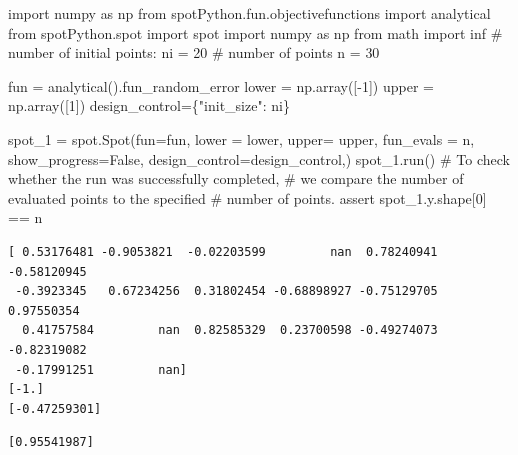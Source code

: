 \documentclass[
  letterpaper,
  DIV=11,
  numbers=noendperiod]{scrreprt}
\newenvironment{Shaded}{\begin{snugshade}}{\end{snugshade}}
\newcommand{\CommentTok}[1]{\textcolor[rgb]{0.37,0.37,0.37}{#1}}
\newcommand{\ControlFlowTok}[1]{\textcolor[rgb]{0.00,0.23,0.31}{#1}}
\newcommand{\DecValTok}[1]{\textcolor[rgb]{0.68,0.00,0.00}{#1}}
\newcommand{\ImportTok}[1]{\textcolor[rgb]{0.00,0.46,0.62}{#1}}
\newcommand{\NormalTok}[1]{\textcolor[rgb]{0.00,0.23,0.31}{#1}}
\newcommand{\OperatorTok}[1]{\textcolor[rgb]{0.37,0.37,0.37}{#1}}
\newcommand{\StringTok}[1]{\textcolor[rgb]{0.13,0.47,0.30}{#1}}
\newcommand{\VariableTok}[1]{\textcolor[rgb]{0.07,0.07,0.07}{#1}}
\begin{document}
\begin{Shaded}
\begin{Highlighting}[]
\ImportTok{import}\NormalTok{ numpy }\ImportTok{as}\NormalTok{ np}
\ImportTok{from}\NormalTok{ spotPython.fun.objectivefunctions }\ImportTok{import}\NormalTok{ analytical}
\ImportTok{from}\NormalTok{ spotPython.spot }\ImportTok{import}\NormalTok{ spot}
\ImportTok{import}\NormalTok{ numpy }\ImportTok{as}\NormalTok{ np}
\ImportTok{from}\NormalTok{ math }\ImportTok{import}\NormalTok{ inf}
\CommentTok{\# number of initial points:}
\NormalTok{ni }\OperatorTok{=} \DecValTok{20}
\CommentTok{\# number of points}
\NormalTok{n }\OperatorTok{=} \DecValTok{30}

\NormalTok{fun }\OperatorTok{=}\NormalTok{ analytical().fun\_random\_error}
\NormalTok{lower }\OperatorTok{=}\NormalTok{ np.array([}\OperatorTok{{-}}\DecValTok{1}\NormalTok{])}
\NormalTok{upper }\OperatorTok{=}\NormalTok{ np.array([}\DecValTok{1}\NormalTok{])}
\NormalTok{design\_control}\OperatorTok{=}\NormalTok{\{}\StringTok{"init\_size"}\NormalTok{: ni\}}

\NormalTok{spot\_1 }\OperatorTok{=}\NormalTok{ spot.Spot(fun}\OperatorTok{=}\NormalTok{fun,}
\NormalTok{            lower }\OperatorTok{=}\NormalTok{ lower,}
\NormalTok{            upper}\OperatorTok{=}\NormalTok{ upper,}
\NormalTok{            fun\_evals }\OperatorTok{=}\NormalTok{ n,}
\NormalTok{            show\_progress}\OperatorTok{=}\VariableTok{False}\NormalTok{,}
\NormalTok{            design\_control}\OperatorTok{=}\NormalTok{design\_control,)}
\NormalTok{spot\_1.run()}
\CommentTok{\# To check whether the run was successfully completed,}
\CommentTok{\# we compare the number of evaluated points to the specified}
\CommentTok{\# number of points.}
\ControlFlowTok{assert}\NormalTok{ spot\_1.y.shape[}\DecValTok{0}\NormalTok{] }\OperatorTok{==}\NormalTok{ n}
\end{Highlighting}
\end{Shaded}

\begin{verbatim}
[ 0.53176481 -0.9053821  -0.02203599         nan  0.78240941 -0.58120945
 -0.3923345   0.67234256  0.31802454 -0.68898927 -0.75129705  0.97550354
  0.41757584         nan  0.82585329  0.23700598 -0.49274073 -0.82319082
 -0.17991251         nan]
[-1.]
[-0.47259301]
\end{verbatim}

\begin{verbatim}
[0.95541987]
\end{verbatim}
\end{document}
